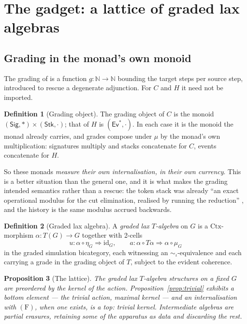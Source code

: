 \documentclass[11pt,a4paper]{article}
\theoremstyle{definition}
\newtheorem{definition}{Definition}[section]
\theoremstyle{plain}
\newtheorem{proposition}[definition]{Proposition}
\theoremstyle{remark}
\newcommand{\CtxC}{\mathrm{Ctx}}
\newcommand{\Sig}{\mathsf{Sig}}
\newcommand{\Stk}{\mathsf{Stk}}
\newcommand{\Ev}{\mathsf{Ev}}
\newcommand{\id}{\mathrm{id}}
\newcommand{\Fcond}{(\mathrm{F})}
\begin{document}
\section{The gadget: a lattice of graded lax algebras}
\label{sec:gadget}

\subsection{Grading in the monad's own monoid}

The grading of \cite[Def.~6.7]{probe} is a function $g : \mathbb{N} \to \mathbb{N}$ bounding the
target steps per source step, introduced to rescue a degenerate adjunction. For $C$ and $H$ it need
not be imported.

\begin{definition}[Grading object]
\label{def:grading}
The grading object of $C$ is the monoid $(\Sig, *) \times (\Stk, \cdot)$; that of $H$ is
$(\Ev^*, \cdot)$. In each case it is the monoid the monad already carries, and grades compose under
$\mu$ by the monad's own multiplication: signatures multiply and stacks concatenate for $C$, events
concatenate for $H$.
\end{definition}

So these monads \emph{measure their own internalisation, in their own currency}. This is a better
situation than the general one, and it is what makes the grading intended semantics rather than a
rescue: the token stack was already ``an exact operational modulus for the cut elimination, realised
by running the reduction'' \cite[Prop.~4.1]{cost}, and the history is the same modulus accrued
backwards.

\begin{definition}[Graded lax algebra]
\label{def:lax-algebra}
A \emph{graded lax $T$-algebra} on $G$ is a $\CtxC$-morphism $\alpha : T(G) \to G$ together with
2-cells
\[
u : \alpha \circ \eta_G \Rightarrow \id_G, \qquad
a : \alpha \circ T\alpha \Rightarrow \alpha \circ \mu_G
\]
in the graded simulation bicategory, each witnessing an $\sim_\iota$-equivalence and each carrying a
grade in the grading object of $T$, subject to the evident coherence.
\end{definition}

\begin{proposition}[The lattice]
\label{prop:lattice}
The graded lax $T$-algebra structures on a fixed $G$ are preordered by the kernel of the action.
Proposition~\ref{prop:trivial} exhibits a bottom element --- the trivial action, maximal kernel ---
and an internalisation with $\Fcond$, when one exists, is a top: trivial kernel. Intermediate
algebras are partial erasures, retaining some of the apparatus as data and discarding the rest.
\end{proposition}
\end{document}
